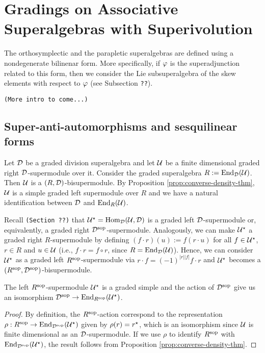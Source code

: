 \documentclass{amsbook}
\begin{document}
\chapter{Gradings on Associative Superalgebras with Superivolution}

The orthosymplectic and the parapletic superalgebras are defined using a nondegenerate bilinenar form. 
More specifically, if $\varphi$ is the superadjunction related to this form, then we consider the Lie subsuperalgebra of the skew elements with respect to $\varphi$ (see Subsection {\tt ??}). 

\vspace{5mm}
{\tt (More intro to come...)}



\section{Super-anti-automorphisms and sesquilinear forms}

Let $\mathcal{D}$ be a graded division superalgebra and let $\mathcal U$ be a finite dimensional graded right $\mathcal{D}$-supermodule over it. Consider the graded superalgebra $R := \operatorname{End}_{\mathcal{D}}(\mathcal U)$. Then $\mathcal U$ is a $(R, \mathcal{D})$-bisupermodule. By Proposition \ref{prop:converse-density-thm}, $\mathcal U$ is a simple graded left supermodule over $R$ and we have a natural identification between $\mathcal{D}$ and $\operatorname{End}_R(\mathcal U)$.

Recall {\tt (Section ??)} that $\mathcal U^\star = \operatorname{Hom}_{\mathcal{D}} (\mathcal U, \mathcal{D})$ is a graded left $\mathcal{D}$-supermodule or, equivalently, a graded right $\mathcal{D}^{\mathrm{sop}}$-supermodule. Analogously, we can make $\mathcal U^\star$ a graded right $R$-supermodule by defining $(f\cdot r) (u) := f(r\cdot u)$ for all $f\in \mathcal U^\star$, $r\in R$ and $u\in \mathcal U$ (i.e., $f\cdot r = f \circ r$, since $R = \operatorname{End}_{\mathcal{D}}(\mathcal U)$). Hence, we can consider $\mathcal U^\star$ as a graded left $R^{\mathrm{sop}}$-supermodule via $r\cdot f = (-1)^{|r||f|} f\cdot r$ %
and $\mathcal U^\star$ becomes a $(R^{\mathrm{sop}}, \mathcal{D}^{\mathrm{sop}})$-bisupermodule.

\begin{lemma}\label{lemma:U-star-R-sop}
    The left $R^{\mathrm{sop}}$-supermodule $\mathcal U^\star$ is a graded simple and the action of $\mathcal{D}^{\mathrm{sop}}$ give us an isomorphism $\mathcal{D}^{\mathrm{sop}} \to \operatorname{End}_{R^{\mathrm{sop}}}(\mathcal U^\star)$.
\end{lemma}

\begin{proof}
    By definition, the $R^{\mathrm{sop}}$-action correspond to the representation $\rho: R^{\mathrm{sop}} \to \operatorname{End}_{\mathcal{D}^{\mathrm{sop}}} (\mathcal U^\star)$ given by $ \rho(r) = r^\star$, which is an isomorphism since $\mathcal U$ is finite dimensional as an $\mathcal{D}$-supermodule. If we use $\rho$ to identify $R^{\mathrm{sop}}$ with $\operatorname{End}_{\mathcal{D}^{\mathrm{sop}}} (\mathcal U^\star)$, the result follows from Proposition \ref{prop:converse-density-thm}.
\end{proof}
\end{document}
